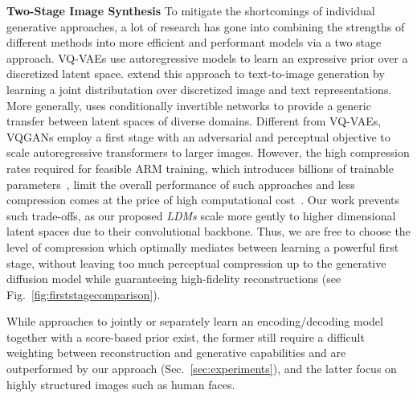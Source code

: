 \documentclass[10pt,twocolumn,letterpaper]{article}
\begin{document}
\textbf{Two-Stage Image Synthesis}
\enlargethispage{\baselineskip}
To mitigate the shortcomings of individual generative approaches, a lot of research \cite{DBLP:conf/iclr/DaiW19,  DBLP:conf/nips/RombachEO20, DBLP:journals/corr/abs-2012-09841, yu2021vectorquantized, DBLP:journals/corr/abs-2104-10157, DBLP:conf/nips/RazaviOV19} has gone into combining the strengths of different methods into more efficient and performant models via a two stage approach. VQ-VAEs \cite{DBLP:journals/corr/abs-2104-10157, DBLP:conf/nips/RazaviOV19} use autoregressive models to learn an expressive prior over a discretized latent space.
\cite{DBLP:journals/corr/abs-2102-12092} extend this approach to text-to-image generation by learning a joint distributation over discretized image and text representations.
More generally, \cite{DBLP:conf/nips/RombachEO20} uses conditionally invertible networks to provide a generic transfer between latent spaces of diverse domains.
Different from VQ-VAEs, VQGANs \cite{DBLP:journals/corr/abs-2012-09841, yu2021vectorquantized} employ a first stage with an adversarial and perceptual objective to scale autoregressive transformers to larger images.
However, the high compression rates required for feasible ARM training, which introduces billions of trainable parameters~\cite{DBLP:journals/corr/abs-2102-12092,DBLP:journals/corr/abs-2012-09841}, limit the overall performance of such approaches and less compression comes at the price of high computational cost~\cite{DBLP:journals/corr/abs-2102-12092,DBLP:journals/corr/abs-2012-09841}.
Our work prevents such trade-offs, as our proposed \emph{LDMs} scale more gently to higher dimensional latent spaces due to their convolutional backbone. Thus, we are free to choose the level of compression which optimally mediates between learning a powerful first stage, without leaving too much perceptual compression up to the generative diffusion model while guaranteeing high-fidelity reconstructions (see Fig.~\ref{fig:firststagecomparison}).

While approaches to jointly \cite{DBLP:journals/corr/abs-2106-05931} or separately \cite{DBLP:journals/corr/abs-2106-06819} 
learn an encoding/decoding model together with a score-based prior exist,
the former still require a difficult weighting between reconstruction and generative capabilities \cite{DBLP:conf/iclr/DaiW19} and are outperformed by our approach (Sec.~\ref{sec:experiments}), and the latter focus on highly structured images such as human faces.
\end{document}
